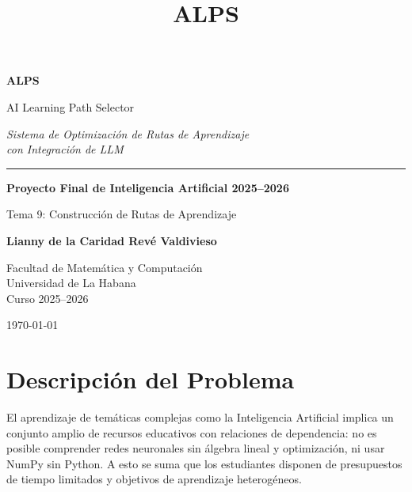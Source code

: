 \documentclass[11pt, a4paper]{article}
\title{\textbf{ALPS}}
\author{}
\date{}
\begin{document}
\begin{titlepage}
\centering
\vspace*{2.5cm}

{\color{alpsblue}\Huge\bfseries ALPS\par}
\vspace{0.4cm}
{\color{alpsaccent}\LARGE AI Learning Path Selector\par}
\vspace{0.6cm}
{\large\itshape Sistema de Optimización de Rutas de Aprendizaje\\con Integración de LLM\par}

\vspace{1.5cm}
{\color{alpsaccent}\rule{0.55\textwidth}{1.2pt}}

\vspace{1.2cm}
{\large\bfseries Proyecto Final de Inteligencia Artificial 2025–2026\par}
\vspace{0.3cm}
{\large Tema 9: Construcción de Rutas de Aprendizaje\par}

\vfill

{\large\bfseries Lianny de la Caridad Revé Valdivieso\par}
\vspace{0.8cm}
{\color{alpsgray}
Facultad de Matemática y Computación\\
Universidad de La Habana\\
Curso 2025–2026\par}

\vspace{1cm}
{\color{alpsgray}\today}
\end{titlepage}

\newpage
\tableofcontents
\newpage

\section{Descripción del Problema}

El aprendizaje de temáticas complejas como la Inteligencia Artificial implica un conjunto amplio de recursos educativos con relaciones de dependencia: no es posible comprender redes neuronales sin álgebra lineal y optimización, ni usar NumPy sin Python. A esto se suma que los estudiantes disponen de presupuestos de tiempo limitados y objetivos de aprendizaje heterogéneos.
\end{document}
